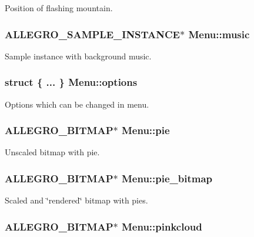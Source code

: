 Position of flashing mountain. \hypertarget{structMenu_a7b8c42bd64118eb18dceafbd9ac8b3d5}{
\subsubsection[{music}]{\setlength{\rightskip}{0pt plus 5cm}A\-L\-L\-E\-G\-R\-O\-\_\-\-S\-A\-M\-P\-L\-E\-\_\-\-I\-N\-S\-T\-A\-N\-C\-E$\ast$ Menu\-::music}}\label{structMenu_a7b8c42bd64118eb18dceafbd9ac8b3d5}
Sample instance with background music. \hypertarget{structMenu_aaacb604a274394a6000f437a081b13df}{
\subsubsection[{options}]{\setlength{\rightskip}{0pt plus 5cm}struct \{ ... \}   Menu\-::options}}\label{structMenu_aaacb604a274394a6000f437a081b13df}
Options which can be changed in menu. \hypertarget{structMenu_a397eb035f88ef8138c4ba29f3fc1d63c}{
\subsubsection[{pie}]{\setlength{\rightskip}{0pt plus 5cm}A\-L\-L\-E\-G\-R\-O\-\_\-\-B\-I\-T\-M\-A\-P$\ast$ Menu\-::pie}}\label{structMenu_a397eb035f88ef8138c4ba29f3fc1d63c}
Unscaled bitmap with pie. \hypertarget{structMenu_ab46ce3041264bac0aabde3abd7549877}{
\subsubsection[{pie\-\_\-bitmap}]{\setlength{\rightskip}{0pt plus 5cm}A\-L\-L\-E\-G\-R\-O\-\_\-\-B\-I\-T\-M\-A\-P$\ast$ Menu\-::pie\-\_\-bitmap}}\label{structMenu_ab46ce3041264bac0aabde3abd7549877}
Scaled and \char`\"{}rendered\char`\"{} bitmap with pies. \hypertarget{structMenu_aec110fca9c47ccf9aaf6e4e7589b86f2}{
\subsubsection[{pinkcloud}]{\setlength{\rightskip}{0pt plus 5cm}A\-L\-L\-E\-G\-R\-O\-\_\-\-B\-I\-T\-M\-A\-P$\ast$ Menu\-::pinkcloud}}\label{structMenu_aec110fca9c47ccf9aaf6e4e7589b86f2}

